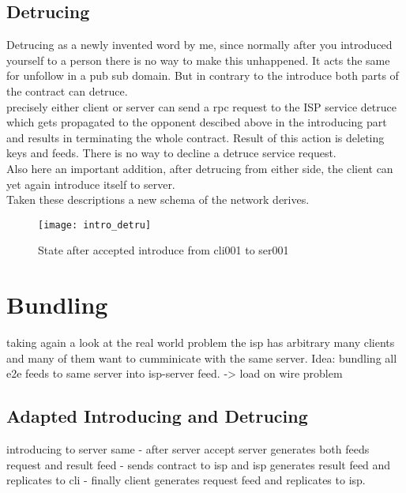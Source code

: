 \subsection{Detrucing}
Detrucing as a newly invented word by me, since normally after you introduced yourself to a person there is no way to make this unhappened. It acts the same for unfollow in a pub sub domain. But in contrary to the introduce both parts of the contract can detruce. \\
precisely either client or server can send a rpc request to the ISP service detruce which gets propagated to the opponent descibed above in the introducing part and results in terminating the whole contract. Result of this action is deleting keys and feeds. There is no way to decline a detruce service request.
\\
Also here an important addition, after detrucing from either side, the client can yet again introduce itself to server.
\\
Taken these descriptions a new schema of the network derives.
\begin{figure}
    \centering
    \texttt{[image: intro\_detru]}
    \caption{State after accepted introduce from cli001 to ser001}
    \label{fig:contract_cli_isp}
\end{figure}

\pagebreak

\section{Bundling}
taking again a look at the real world problem the isp has arbitrary many clients and many of them want to cumminicate with the same server. Idea: bundling all e2e feeds to same server into isp-server feed.
-> load on wire problem

\subsection{Adapted Introducing and Detrucing}
introducing to server same - after server accept server generates both feeds request and result feed - sends contract to isp and isp generates result feed and replicates to cli - finally client generates request feed and replicates to isp.


